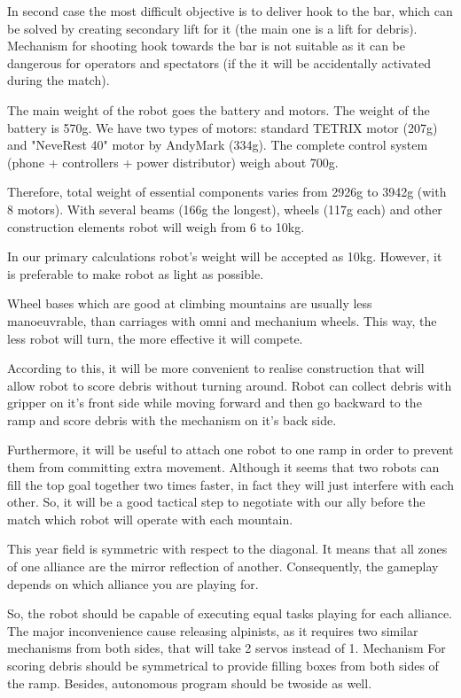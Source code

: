 \begin{enumerate*}
		In second case the most difficult objective is to deliver hook to the bar, which can be solved by creating secondary lift for it (the main one is a lift for debris). Mechanism for shooting hook towards the bar is not suitable as it can be dangerous for operators and spectators (if the it will be accidentally activated during the match).\newline
		\item The main weight of the robot goes the battery and motors. The weight of the battery is 570g. We have two types of motors: standard TETRIX motor (207g) and "NeveRest 40" motor by AndyMark (334g). The complete control system (phone + controllers + power distributor) weigh about 700g.
		
		Therefore, total weight of essential components varies from 2926g to 3942g (with 8 motors). With several beams (166g the longest), wheels (117g each) and other construction elements robot will weigh from 6 to 10kg. 
		
		In our primary calculations robot's weight will be accepted as 10kg. However, it is preferable to make robot as light as possible.\newline
		\item Wheel bases which are good at climbing mountains are usually less manoeuvrable, than carriages with omni and mechanium wheels. This way, the less robot will turn, the more effective it will compete.
		
		According to this, it will be more convenient to realise construction that will allow robot to score debris without turning around. Robot can collect debris with gripper on it's front side while moving forward and then go backward to the ramp and score debris with the mechanism on it's back side.
		
		Furthermore, it will be useful to attach one robot to one ramp in order to prevent them from committing extra movement. Although it seems that two robots can fill the top goal together two times faster, in fact they will just interfere with each other. So, it will be a good tactical step to negotiate with our ally before the match which robot will operate with each mountain.\newline
		\item This year field is symmetric with respect to the diagonal. It means that all zones of one alliance are the mirror reflection of another. Consequently, the gameplay depends on which alliance you are playing for.
		
		So, the robot should be capable of executing equal tasks playing for each alliance. The major inconvenience cause releasing alpinists, as it requires two similar mechanisms from both sides, that will take 2 servos instead of 1. Mechanism For scoring debris should be symmetrical to provide filling boxes from both sides of the ramp. Besides, autonomous program should be twoside as well.
		
	\end{enumerate*}
	
